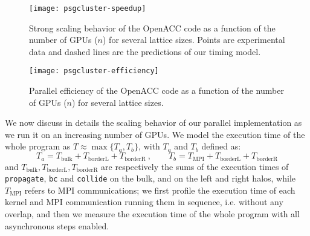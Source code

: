 \documentclass[times]{cpeauth}
\newcommand{\red}[1]{\textcolor{red}{#1}}
\begin{document}


%
\begin{figure}
\centering
\texttt{[image: psgcluster-speedup]}
\caption{\label{fig:scalability} Strong scaling behavior of the OpenACC code 
as a function of the number of GPUs ($n$) for several lattice sizes. 
Points are experimental data and dashed lines are the predictions of 
our timing model.}
\end{figure}
%

%
\begin{figure}
\centering
\texttt{[image: psgcluster-efficiency]}
\caption{\label{fig:efficiency} Parallel efficiency of the OpenACC code 
as a function of the number of GPUs ($n$) for several lattice sizes.
}
\end{figure}
%

%
We now discuss in details the scaling behavior of our parallel implementation 
as we run it on an increasing number of GPUs.
%
We model the execution time of the whole program as $T \approx \max\{T_a, T_b\}$, 
with $T_a$ and $T_b$ defined as:
\begin{equation*}
T_a = T_{\text{bulk}} + T_{\text{borderL}} + T_{\text{borderR}}~,~~~~~~~~~
T_b = T_{\text{MPI}}  + T_{\text{borderL}} + T_{\text{borderR}}
\end{equation*}
%
%
and $T_{\text{bulk}}, T_{\text{borderL}}, T_{\text{borderR}}$ 
are respectively the sums of the execution times of {\tt propagate}, 
{\tt bc} and {\tt collide} on the bulk, and on the left and right halos, 
while $T_{\text{MPI}}$ refers to MPI communications;
we first profile the execution time of each kernel and MPI communication 
running them in sequence, i.e. without any overlap, and then we measure the 
execution time of the whole program with all asynchronous steps enabled.
\end{document}
